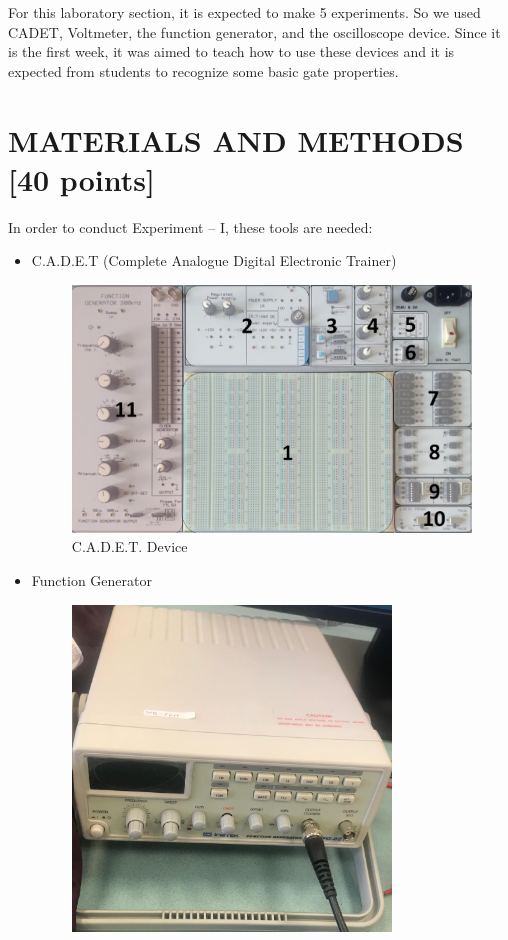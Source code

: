 \documentclass[pdftex,12pt,a4paper]{article}
\begin{document}
For this laboratory section, it is expected to make 5 experiments. So we used CADET, Voltmeter, the function generator, and the oscilloscope device. Since it is the first week, it was aimed to teach how to use these devices and it is expected from students to recognize some basic gate properties. 

\section{MATERIALS AND METHODS [40 points]}
In order to conduct Experiment – I, these tools are needed:

\begin{itemize}
    \item C.A.D.E.T (Complete Analogue Digital Electronic Trainer)
        \begin{figure}[ht]
    	\centering
    	\includegraphics[width=1\textwidth]{CADET.png}	
    	\caption{C.A.D.E.T. Device\cite{ref1}}
    	\label{fig2}
        \end{figure}
    \newpage
    \item Function Generator
    \begin{figure}[ht]
    	\centering
    	\includegraphics[width=0.8\textwidth]{funcGen.jpeg}	

\end{figure}
\end{itemize}
\end{document}
